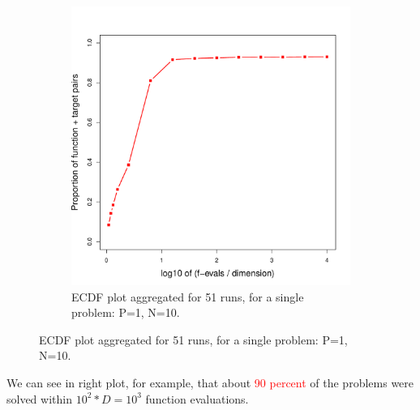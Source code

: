 \documentclass[hyperref={pdfpagelabels=false}]{beamer}
\begin{document}
\begin{frame}
\begin{figure}
\begin{subfigure}{0.49\textwidth}
\includegraphics[width = \textwidth]{DESEcdf.pdf}
\caption{ECDF plot aggregated for 51 runs, for a single problem: P=1, N=10.}
\label{fig:right}
\end{subfigure}
\label{fig:combined}
\end{figure}
\vspace{-3mm}
We can see in right plot, for example, that about \textcolor{red}{90 percent} of the problems were solved within $10^2*D = 10^3$ function evaluations.

\end{frame}
\end{document}

